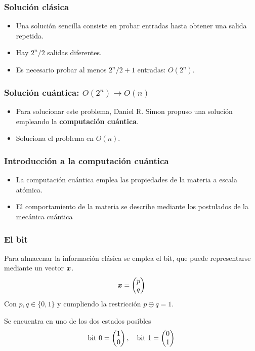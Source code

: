 \begin{frame}
\frametitle{Solución clásica}
\begin{itemize}
\item Una solución sencilla consiste en probar entradas hasta obtener una salida 
repetida.

\item Hay $2^n/2$ salidas diferentes.

\item Es necesario probar al menos $2^n/2 + 1$ entradas: $O(2^n)$.
\end{itemize}
\end{frame}
\begin{frame}
\frametitle{Solución cuántica: $O(2^n) \rightarrow O(n)$}
\begin{itemize}
\item Para solucionar este problema, Daniel R. Simon propuso una solución 
empleando la \textbf{computación cuántica}.
\item Soluciona el problema en $O(n)$.
\end{itemize}

\end{frame}
\begin{frame}
\frametitle{Introducción a la computación cuántica}
\begin{itemize}
\item La computación cuántica emplea las propiedades de la materia a escala 
atómica.
\item El comportamiento de la materia se describe mediante los postulados de la 
mecánica cuántica
\end{itemize}
\end{frame}
\begin{frame}
\frametitle{El bit}
Para almacenar la información clásica se emplea el bit, que puede representarse 
mediante un vector $\boldsymbol{x}$.
$$ \boldsymbol{x} = \begin{pmatrix} p \\ q \end{pmatrix} $$
Con  $p, q \in \{0,1\}$ y cumpliendo la restricción $p \oplus q = 1$.

Se encuentra en uno de los dos estados posibles
$$ \text{bit 0} = \begin{pmatrix} 1 \\ 0 \end{pmatrix},\quad \text{bit 1} = \begin{pmatrix} 0 \\ 1 \end{pmatrix} $$



\end{frame}
